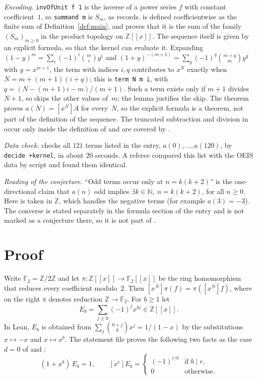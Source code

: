 \documentclass[11pt]{amsart}
\theoremstyle{plain}
\theoremstyle{definition}
\newcommand{\N}{\mathbb{N}}
\newcommand{\Z}{\mathbb{Z}}
\newcommand{\F}{\mathbb{F}_2}
\newcommand{\coef}[1]{[x^{#1}]}
\begin{document}
\emph{Encoding.} \texttt{invOfUnit f 1} is the inverse of a power series $f$ with constant coefficient~$1$, so \texttt{summand m} is $S_m$, as  records.  is defined coefficientwise as the finite sum of Definition~\ref{def:main}, and  proves that it is the sum of the family $(S_m)_{m\ge0}$ in the product topology on $\Z[[x]]$. The sequence  itself is given by an explicit formula, so that the kernel can evaluate it. Expanding $(1-y)^m=\sum_i(-1)^i\binom{m}{i}y^i$ and $(1+y)^{-(m+1)}=\sum_q(-1)^q\binom{m+q}{m}y^q$ with $y=x^{m+1}$, the term with indices $i,q$ contributes to $x^N$ exactly when $N=m+(m+1)(i+q)$; this is \texttt{term N m i}, with $q=(N-(m+1)i-m)/(m+1)$. Such a term exists only if $m+1$ divides $N+1$, so  skips the other values of~$m$; the lemma  justifies the skip. The theorem  proves $a(N)=\coef{N}A$ for every~$N$, so the explicit formula is a theorem, not part of the definition of the sequence. The truncated subtraction and division in  occur only inside the definition of  and are covered by .

\emph{Data check.}  checks all $121$ terms listed in the entry, $a(0),\dots,a(120)$, by \texttt{decide +kernel}, in about $20$ seconds. A referee compared this list with the OEIS data by script and found them identical.

\emph{Reading of the conjecture.} ``Odd terms occur only at $n=k(k+2)$'' is the one-directional claim that $a(n)$ odd implies $\exists k\in\N,\ n=k(k+2)$, for all $n\ge0$. Here  is taken in $\Z$, which handles the negative terms (for example $a(3)=-3$). The converse is stated separately in the formula section of the entry and is not marked as a conjecture there, so it is not part of .

\section{Proof}\label{sec:proof}

Write $\F=\Z/2\Z$ and let $\pi\colon\Z[[x]]\to\F[[x]]$ be the ring homomorphism that reduces every coefficient modulo~$2$. Then $\coef{N}\pi(f)=\pi(\coef{N}f)$, where on the right $\pi$ denotes reduction $\Z\to\F$. For $b\ge1$ let
\[
  E_b=\sum_{j\ge0}(-1)^jx^{bj}\in\Z[[x]].
\]
In Lean, $E_b$ is obtained from $\sum_j\binom{0+j}{0}x^j=1/(1-x)$ by the substitutions $x\mapsto-x$ and $x\mapsto x^b$. The statement file proves the following two facts as the case $d=0$ of  and :
\begin{equation}\label{eq:E}
  (1+x^b)\,E_b=1,\qquad
  \coef{r}E_b=\begin{cases}(-1)^{r/b}&\text{if }b\mid r,\\ 0&\text{otherwise.}\end{cases}
\end{equation}
\end{document}
